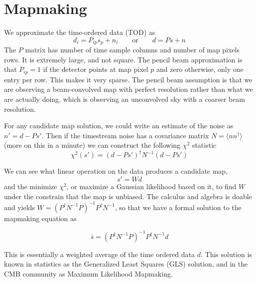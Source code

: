 \section{Mapmaking}

We approximate the time-ordered data (TOD) as 
\begin{equation}
  d_i = P_{ip}s_p + n_i \qquad \mbox{or} \qquad d = Ps + n
\end{equation}
The $P$ matrix has number of time sample columns and number of map pixels rows.  It is extremely large, and not square.  The pencil beam approximation is that $P_{ip} = 1$ if the detector points at map pixel $p$ and zero otherwise, only one entry per row.  This makes it very sparse.  The pencil beam assumption is that we are observing a beam-convolved map with perfect resolution rather than what we are actually doing, which is observing an unconvolved sky with a coarser beam resolution.

For any candidate map solution, we could write an estimate of the noise as $n' = d-Ps'$.  Then if the timestream noise has a covariance matrix $N = \langle n n^\dag \rangle$ (more on this in a minute) we can construct the following $\chi^2$ statistic
\begin{equation}
  \chi^2(s') = (d-Ps')^\dag N^{-1} (d-Ps') 
\end{equation}

We can see what linear operation on the data produces a candidate map, 
\begin{equation}
  s' = Wd
\end{equation}
and the minimize $\chi^2$, or maximize a Gaussian likelihood based on it, to find $W$ under the constrain that the map is unbiased.  The calculus and algebra is doable and yields $W = (P^\dag N^{-1}P)^{-1} P^\dag N^{-1}$, so that we have a formal solution to the mapmaking equation as

\begin{equation}
\bar s = (P^\dag N^{-1}P)^{-1} P^\dag N^{-1}d \label{eqn:mapmaking}
\end{equation}

This is essentially a weighted average of the time ordered data $d$.  This solution is known in statistics as the Generalized Least Squares (GLS) solution, and in the CMB community as Maximum Likelihood Mapmaking.  

